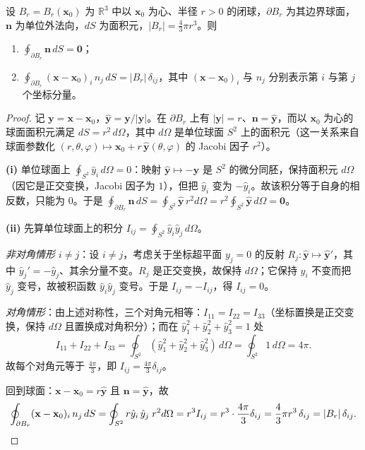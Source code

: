 \begin{lemma}[球面上两个基本积分恒等式]\label{lem:sphere_flux_identities}
设 $B_r = B_r(\mathbf{x}_0)$ 为 $\mathbb R^3$ 中以 $\mathbf x_0$ 为心、半径 $r>0$ 的闭球，$\partial B_r$ 为其边界球面，$\mathbf n$ 为单位外法向，$dS$ 为面积元，$|B_r| = \tfrac43\pi r^3$。则
\begin{enumerate}[label=(\roman*)]
    \item $\displaystyle \oint_{\partial B_r} \mathbf{n} \, dS = \mathbf{0}$；
    \item $\displaystyle \oint_{\partial B_r} (\mathbf{x}-\mathbf{x}_0)_i\, n_j \, dS = |B_r| \, \delta_{ij}$，其中 $(\mathbf{x}-\mathbf{x}_0)_i$ 与 $n_j$ 分别表示第 $i$ 与第 $j$ 个坐标分量。
\end{enumerate}
\end{lemma}

\begin{proof}
记 $\mathbf y = \mathbf x-\mathbf x_0$，$\hat{\mathbf y} = \mathbf y/|\mathbf y|$。在 $\partial B_r$ 上有 $|\mathbf y| = r$、$\mathbf n = \hat{\mathbf y}$，而以 $\mathbf x_0$ 为心的球面面积元满足 $dS = r^2\,d\Omega$，其中 $d\Omega$ 是单位球面 $S^2$ 上的面积元（这一关系来自球面参数化 $(r,\theta,\varphi)\mapsto \mathbf x_0+r\,\hat{\mathbf y}(\theta,\varphi)$ 的 Jacobi 因子 $r^2$）。

\textbf{(i)} 单位球面上 $\oint_{S^2} \hat y_i \, d\Omega = 0$：映射 $\hat{\mathbf y}\mapsto -\hat{\mathbf y}$ 是 $S^2$ 的微分同胚，保持面积元 $d\Omega$（因它是正交变换，Jacobi 因子为 $1$），但把 $\hat y_i$ 变为 $-\hat y_i$。故该积分等于自身的相反数，只能为 $0$。于是
$\oint_{\partial B_r}\mathbf n\,dS = \oint_{S^2} \hat{\mathbf y}\,r^2d\Omega = r^2\oint_{S^2}\hat{\mathbf y}\,d\Omega=\mathbf 0$。

\textbf{(ii)} 先算单位球面上的积分 $I_{ij} = \oint_{S^2}\hat y_i\hat y_j\,d\Omega$。

\emph{非对角情形 $i\ne j$}：设 $i\ne j$，考虑关于坐标超平面 $y_j = 0$ 的反射 $R_j: \hat{\mathbf y}\mapsto \hat{\mathbf y}'$，其中 $\hat y_j' = -\hat y_j$、其余分量不变。$R_j$ 是正交变换，故保持 $d\Omega$；它保持 $\hat y_i$ 不变而把 $\hat y_j$ 变号，故被积函数 $\hat y_i\hat y_j$ 变号。于是 $I_{ij} = -I_{ij}$，得 $I_{ij}=0$。

\emph{对角情形}：由上述对称性，三个对角元相等：$I_{11}=I_{22}=I_{33}$（坐标置换是正交变换，保持 $d\Omega$ 且置换成对角积分）；而在 $\hat y_1^2+\hat y_2^2+\hat y_3^2 = 1$ 处
\[
I_{11}+I_{22}+I_{33} = \oint_{S^2} (\hat y_1^2+\hat y_2^2+\hat y_3^2)\,d\Omega = \oint_{S^2} 1\,d\Omega = 4\pi .
\]
故每个对角元等于 $\tfrac{4\pi}{3}$，即 $I_{ij} = \tfrac{4\pi}{3}\delta_{ij}$。

回到球面：$\mathbf x-\mathbf x_0 = r\hat{\mathbf y}$ 且 $\mathbf n = \hat{\mathbf y}$，故
\[
\oint_{\partial B_r}(\mathbf x-\mathbf x_0)_i\,n_j\,dS
= \oint_{S^2} r\hat y_i\,\hat y_j\; r^2 d\Omega
= r^3 I_{ij}
= r^3\cdot\frac{4\pi}{3}\delta_{ij}
= \frac{4}{3}\pi r^3\,\delta_{ij}
= |B_r|\,\delta_{ij}. \qedhere
\]
\end{proof}

